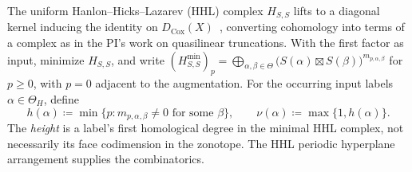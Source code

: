 \documentclass[11pt,reqno]{amsart}
\theoremstyle{remark}
\newcommand{\depth}{\operatorname{depth}}
\newcommand{\Nef}{\operatorname{Nef}}
\newcommand{\Cox}{\operatorname{Cox}}
\newcommand{\cone}{\operatorname{cone}}
\newcommand{\PP}{\mathbb{P}}
\newcommand{\cH}{\mathcal{H}}
\begin{document}
%
The uniform Hanlon--Hicks--Lazarev (HHL) complex $H_{S,S}$ lifts to a diagonal kernel inducing the identity on $D_{\Cox}(X)$~\cite{longLiveKing}, converting cohomology into terms of a complex as in the PI's work on quasilinear truncations. With the first factor as input, minimize $H_{S,S}$, and write $(H_{S,S}^{\min})_p
 =\bigoplus_{\alpha,\beta\in\Theta}
 \bigl(S(\alpha)\boxtimes S(\beta)\bigr)^{m_{p,\alpha,\beta}}$ for $p\geq 0$,
%
with $p=0$ adjacent to the augmentation. For the occurring input labels $\alpha\in\Theta_H$, define
\[
 h(\alpha)\coloneqq\min\{p:m_{p,\alpha,\beta}\ne0\text{ for some }\beta\},
 \qquad \nu(\alpha)\coloneqq\max\{1,h(\alpha)\}.
\]
The \emph{height} is a label's first homological degree in the minimal HHL complex, not necessarily its face codimension in the zonotope. The HHL periodic hyperplane arrangement supplies the combinatorics.
\end{document}

